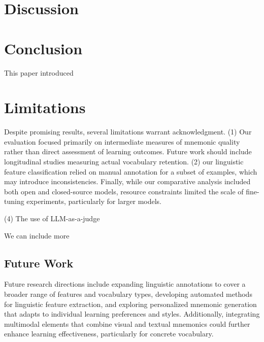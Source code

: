 \section{Discussion} \label{sec:discussion}


\section{Conclusion} \label{sec:conclusion}
This paper introduced

\section{Limitations} \label{sec:limitations}
Despite promising results, several limitations warrant acknowledgment. (1) Our evaluation focused primarily on intermediate measures of mnemonic quality rather than direct assessment of learning outcomes. Future work should include longitudinal studies measuring actual vocabulary retention. (2) our linguistic feature classification relied on manual annotation for a subset of examples, which may introduce inconsistencies. Finally, while our comparative analysis included both open and closed-source models, resource constraints limited the scale of fine-tuning experiments, particularly for larger models.

(4) The use of LLM-as-a-judge

We can include more

\subsection{Future Work} \label{sec:future-work}
Future research directions include expanding linguistic annotations to cover a broader range of features and vocabulary types, developing automated methods for linguistic feature extraction, and exploring personalized mnemonic generation that adapts to individual learning preferences and styles. Additionally, integrating multimodal elements that combine visual and textual mnemonics could further enhance learning effectiveness, particularly for concrete vocabulary.
